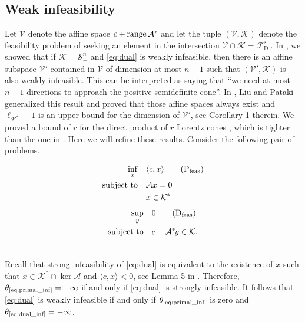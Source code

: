 \documentclass{article}
\newcommand{\inProd}[2]{\langle #1 , #2 \rangle }
\newcommand{\feasS}{\mathcal{F}_{\text{D }}^s}
\newcommand{\PSDcone}[1]{{\mathcal{S}^{#1}_+}}
\newcommand{\stdMap}{ {\mathcal{A}}}
\newcommand{\stdCone}{ {\mathcal{K}}}
\newcommand{\stdAffine}{ \mathcal{V}}
\newcommand{\opt}[1]{ {\theta _{#1}}}
\newcommand{\matRange}{{\mathrm{ range } \,}}
\newcommand{\T}{\ast\hspace{-1pt}}
\begin{document}
\subsection{Weak infeasibility}\label{sec:wi}
Let $\stdAffine $ denote the affine space $ c + \matRange{\stdMap^\T }$ and let 
the tuple $(\stdAffine, \stdCone)$ denote the  feasibility problem of seeking 
an element in the intersection $\stdAffine \cap \stdCone = \feasS$. 
In \cite{lourenco_muramatsu_tsuchiya},
we showed that if $\stdCone = \PSDcone{n}$ and \eqref{eq:dual} is weakly infeasible, then there is an affine subspace $\stdAffine '$ contained 
in $\stdAffine$ of dimension at most $n -1$ such that $(\stdAffine ', \stdCone)$ is also weakly infeasible. 
This can be interpreted as saying that ``we need at most $n-1$ directions to approach the positive semidefinite cone''. 
In \cite{LP17}, Liu and Pataki generalized this result and proved that those affine spaces  always 
exist and $\ell _{\stdCone^*} - 1$ is  an upper bound for the dimension of $\stdAffine '$, 
see Corollary 1 therein.
We proved a bound of $r$  for the direct product of $r$ Lorentz 
cones \cite{lourenco_muramatsu_tsuchiya2},  which is tighter than the one in \cite{LP17}.
Here we will refine these results. Consider the following pair of problems.
\vspace{-3\baselineskip}
\begin{multicols}{2}
	\begin{align}
	\underset{x}{\inf} & \quad \inProd{c}{x} \label{eq:primal_inf}\tag{$\text{P}_{\text{feas}}$}\\ 
	\mbox{subject to} & \quad \stdMap x = 0 \nonumber \\ 
	&\quad x \in \stdCone ^* \nonumber 
	\end{align}
	\break
	\begin{align}
	\underset{y}{\sup} & \quad 0 \label{eq:dual_inf} \tag{$\text{D}_{\text{feas}}$} \\ 
	\mbox{subject to} & \quad c - \stdMap ^\T y \in \stdCone. \nonumber\\ \nonumber
	\end{align}
\end{multicols}
\vspace{-1\baselineskip}
Recall that strong infeasibility of \eqref{eq:dual} is equivalent to the existence of $x$ such that 
$x \in \stdCone^*\cap \ker \stdMap$ and $\inProd{c}{x} < 0$, see Lemma 5 in \cite{Luo97dualityresults}.
Therefore,  $\opt{\text{\ref{eq:primal_inf}}} = -\infty$ if 
and only if \eqref{eq:dual} is strongly infeasible. It follows that  \eqref{eq:dual} is weakly infeasible if and only if $\opt{\text{\ref{eq:primal_inf}}} $ is zero and $\opt{\text{\ref{eq:dual_inf}}} = -\infty$.
\end{document}
